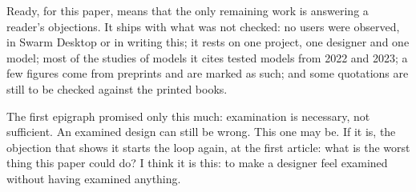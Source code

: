 \documentclass[11pt,a4paper]{article}
\newcounter{art}
\begin{document}
Ready, for this paper, means that the only remaining work is answering a reader's objections. It ships with what was not checked: no users were observed, in Swarm Desktop or in writing this; it rests on one project, one designer and one model; most of the studies of models it cites tested models from 2022 and 2023; a few figures come from preprints and are marked as such; and some quotations are still to be checked against the printed books.

The first epigraph promised only this much: examination is necessary, not sufficient. An examined design can still be wrong. This one may be. If it is, the objection that shows it starts the loop again, at the first article: what is the worst thing this paper could do? I think it is this: to make a designer feel examined without having examined anything.
\end{document}
